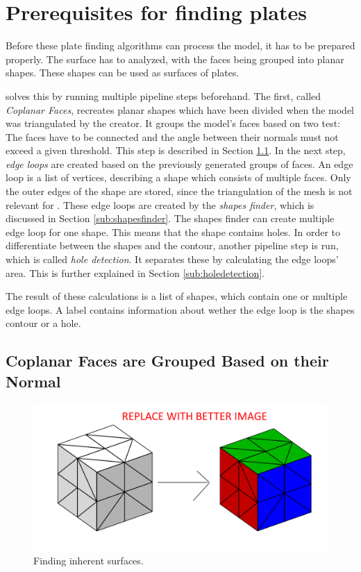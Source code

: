 \documentclass[../ClassicThesis.tex]{subfiles}
\begin{document}
\section{Prerequisites for finding plates}

Before these plate finding algorithms can process the model, it has to be prepared properly. The surface has to analyzed, with the faces being grouped into planar shapes. These shapes can be used as surfaces of plates. 

\platener solves this by running multiple pipeline steps beforehand. The first, called \emph{Coplanar Faces}, recreates planar shapes which have been divided when the model was triangulated by the creator. It groups the model's faces based on two test: The faces have to be connected and the angle between their normals must not exceed a given threshold. This step is described in Section \ref{sub:coplanarfaces}. In the next step, \emph{edge loops} are created based on the previously generated groups of faces. An edge loop is a list of vertices, describing a shape which consists of multiple faces. Only the outer edges of the shape are stored, since the triangulation of the mesh is not relevant for \platener. These edge loops are created by the \emph{shapes finder}, which is discussed in Section \ref{sub:shapesfinder}. The shapes finder can create multiple edge loop for one shape. This means that the shape contains holes. In order to differentiate between the shapes and the contour, another pipeline step is run, which is called \emph{hole detection}. It separates these by calculating the edge loops' area. This is further explained in Section \ref{sub:holedetection}.

The result of these calculations is a list of shapes, which contain one or multiple edge loops. A label contains information about wether the edge loop is the shapes contour or a hole.

\subsection{Coplanar Faces are Grouped Based on their Normal}\label{sub:coplanarfaces}

\begin{figure}
    \centering
    \includegraphics[width=1.0\columnwidth]{Images/plates_coplanar.png}
    \caption{Finding inherent surfaces.}
    \label{fig:coplanar}
\end{figure}
\end{document}
